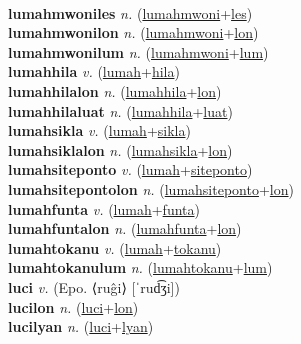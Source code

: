  \label{lumahmwoni} \\
\textbf{lumahmwoniles} \textit{n.} (\hyperref[lumahmwoni]{lumahmwoni}+\hyperref[les]{les})
 \label{lumahmwoniles} \\
\textbf{lumahmwonilon} \textit{n.} (\hyperref[lumahmwoni]{lumahmwoni}+\hyperref[lon]{lon})
 \label{lumahmwonilon} \\
\textbf{lumahmwonilum} \textit{n.} (\hyperref[lumahmwoni]{lumahmwoni}+\hyperref[lum]{lum})
 \label{lumahmwonilum} \\
\textbf{lumahhila} \textit{v.} (\hyperref[lumah]{lumah}+\hyperref[hila]{hila})
 \label{lumahhila} \\
\textbf{lumahhilalon} \textit{n.} (\hyperref[lumahhila]{lumahhila}+\hyperref[lon]{lon})
 \label{lumahhilalon} \\
\textbf{lumahhilaluat} \textit{n.} (\hyperref[lumahhila]{lumahhila}+\hyperref[luat]{luat})
 \label{lumahhilaluat} \\
\textbf{lumahsikla} \textit{v.} (\hyperref[lumah]{lumah}+\hyperref[sikla]{sikla})
 \label{lumahsikla} \\
\textbf{lumahsiklalon} \textit{n.} (\hyperref[lumahsikla]{lumahsikla}+\hyperref[lon]{lon})
 \label{lumahsiklalon} \\
\textbf{lumahsiteponto} \textit{v.} (\hyperref[lumah]{lumah}+\hyperref[siteponto]{siteponto})
 \label{lumahsiteponto} \\
\textbf{lumahsitepontolon} \textit{n.} (\hyperref[lumahsiteponto]{lumahsiteponto}+\hyperref[lon]{lon})
 \label{lumahsitepontolon} \\
\textbf{lumahfunta} \textit{v.} (\hyperref[lumah]{lumah}+\hyperref[funta]{funta})
 \label{lumahfunta} \\
\textbf{lumahfuntalon} \textit{n.} (\hyperref[lumahfunta]{lumahfunta}+\hyperref[lon]{lon})
 \label{lumahfuntalon} \\
\textbf{lumahtokanu} \textit{v.} (\hyperref[lumah]{lumah}+\hyperref[tokanu]{tokanu})
 \label{lumahtokanu} \\
\textbf{lumahtokanulum} \textit{n.} (\hyperref[lumahtokanu]{lumahtokanu}+\hyperref[lum]{lum})
 \label{lumahtokanulum} \\
\textbf{luci} \textit{v.} (Epo. ⟨ruĝi⟩ [ˈrud͡ʒi])
 \label{luci} \\
\textbf{lucilon} \textit{n.} (\hyperref[luci]{luci}+\hyperref[lon]{lon})
 \label{lucilon} \\
\textbf{lucilyan} \textit{n.} (\hyperref[luci]{luci}+\hyperref[lyan]{lyan})
 \label{lucilyan} \\
